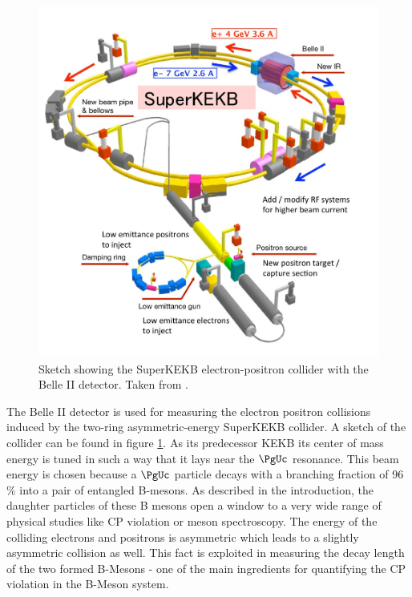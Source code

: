 \begin{figure}
 \centering
 \includegraphics[height=0.4\textheight]{figures/experimental_setup/superkekb.jpg}
 \caption[Sketch showing the SuperKEKB electron-positron collider.]{Sketch showing the SuperKEKB electron-positron collider with the Belle II detector. Taken from \cite{DesyWebseite}.}
 \label{fig-superkekb}
\end{figure}


The Belle II detector is used for measuring the electron positron collisions induced by the two-ring asymmetric-energy SuperKEKB collider. A sketch of the collider can be found in figure \ref{fig-superkekb}. As its predecessor KEKB its center of mass energy is tuned in such a way that it lays near the $\PgUc$ resonance. This beam energy is chosen because a $\PgUc$ particle decays with a branching fraction of 96 \% into a pair of entangled B-mesons. As described in the introduction, the daughter particles of these B mesons open a window to a very wide range of physical studies like CP violation or meson spectroscopy. The energy of the colliding electrons and positrons is asymmetric which leads to a slightly asymmetric collision as well. This fact is exploited in measuring the decay length of the two formed B-Mesons - one of the main ingredients for quantifying the CP violation in the B-Meson system. 

